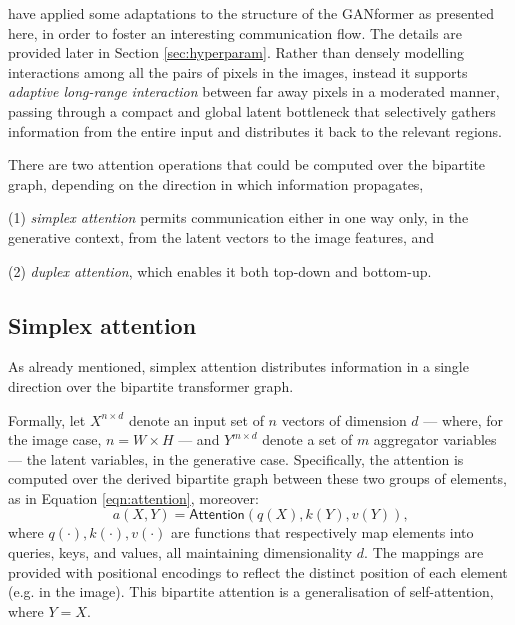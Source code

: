\documentclass{article}
\begin{document}
\citet{hudson2021generative} have applied some adaptations to the structure of the GANformer as 
presented here, in order to foster an interesting communication flow. The details are provided later 
in Section \ref{sec:hyperparam}.
Rather than densely modelling interactions among all the pairs of pixels in the images, instead it 
supports \textit{adaptive long-range interaction} between far away pixels in a moderated manner, 
passing through a compact and global latent bottleneck that selectively gathers information from 
the entire input and distributes it back to the relevant regions. 

There are two attention operations that could be computed over the bipartite graph, depending 
on the direction in which information propagates, 
\begin{enumerate*}
	\item [(1)] \textit{simplex attention} permits communication either in one way only, in the 
	generative context, from the latent vectors to the image features, and
	\item [(2)] \textit{duplex attention}, which enables it both top-down and bottom-up.
\end{enumerate*}

\subsection{Simplex attention}
As already mentioned, simplex attention distributes information in a single direction over the 
bipartite transformer graph. 

Formally, let $X^{n\times d}$ denote an input set of $n$ vectors of dimension $d$ — where, for the 
image case, $n = W\times H$ — and $Y^{m\times d}$ denote a set of $m$ aggregator variables — 
the latent variables, in the generative case. Specifically, the attention is computed over the derived 
bipartite 
graph between these two groups of elements, as in Equation \eqref{eqn:attention}, moreover:
\begin{equation}
	\label{eqn:attention2}
	a(X,Y)=\mathsf{Attention}(q(X), k(Y), v(Y)) \mbox{,}
\end{equation}
where $q(\cdot), k(\cdot), v(\cdot)$ are functions that respectively map elements into queries, 
keys, and values, all maintaining dimensionality $d$. 
The mappings are provided with positional encodings to reflect the distinct position of each element 
(e.g. in the image). This bipartite attention is a generalisation of self-attention, where $Y = X$.
\end{document}
